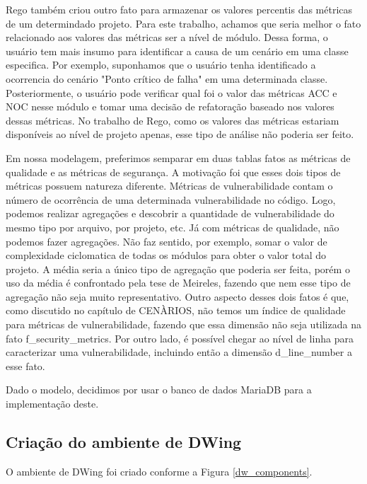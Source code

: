Rego também criou outro fato para armazenar os valores percentis das métricas de um determindado projeto. Para este trabalho, achamos que seria melhor o fato relacionado aos valores das métricas ser a nível de módulo. Dessa forma, o usuário tem mais insumo para identificar a causa de um cenário em uma classe especifica. Por exemplo, suponhamos que o usuário tenha identificado a ocorrencia do cenário "Ponto crítico de falha" em uma determinada classe. Posteriormente, o usuário pode verificar qual foi o valor das métricas ACC e NOC nesse módulo e tomar uma decisão de refatoração baseado nos valores dessas métricas. No trabalho de Rego, como os valores das métricas estariam disponíveis ao nível de projeto apenas, esse tipo de análise não poderia ser feito.

Em nossa modelagem, preferimos semparar em duas tablas fatos as métricas de qualidade e as métricas de segurança. A motivação foi que esses dois tipos de métricas possuem natureza diferente. Métricas de vulnerabilidade contam o número de ocorrência de uma determinada vulnerabilidade no código. Logo, podemos realizar agregações e descobrir a quantidade de vulnerabilidade do mesmo tipo por arquivo, por projeto, etc. Já com métricas de qualidade, não podemos fazer agregações. Não faz sentido, por exemplo, somar o valor de complexidade ciclomatica de todas os módulos para obter o valor total do projeto. A média seria a único tipo de agregação que poderia ser feita, porém o uso da média é confrontado pela tese de Meireles, fazendo que nem esse tipo de agregação não seja muito representativo. Outro aspecto desses dois fatos é que, como discutido no capítulo de CENÀRIOS, não temos um índice de qualidade para métricas de vulnerabilidade, fazendo que essa dimensão não seja utilizada na fato f\_security\_metrics. Por outro lado, é possível chegar ao nível de linha para caracterizar uma vulnerabilidade, incluindo então a dimensão d\_line\_number a esse fato.

Dado o modelo, decidimos por usar o banco de dados MariaDB para a implementação deste.


\subsection{Criação do ambiente de DWing}

O ambiente de DWing foi criado conforme a Figura \ref{dw_components}.

